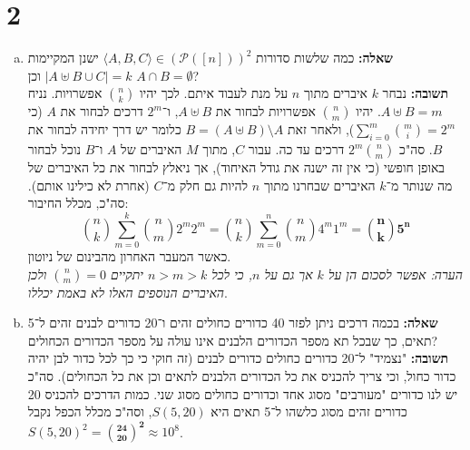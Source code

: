 \documentclass[]{article}
\newcommand\ps    {\mathcal{P}}
\newcommand\ra    {\rangle}
\newcommand\la    {\langle}
\newcommand\bink  {\binom{n}{k}}
\begin{document}
	\section*{2} %
	\begin{enumerate}[(a)]
		\item \textbf{שאלה: }כמה שלשות סדורות $\la A, B, C \ra \in (\ps([n]))^2$ ישנן המקיימות $|A \uplus B \cup C| = k$ וכן $A \cap B = \emptyset$? \\
		\textbf{תשובה: }
		נבחר $k$ איברים מתוך $n$ על מנת לעבוד איתם. לכך יהיו $\binom{n}{k}$ אפשרויות. נניח $A \uplus B = m$. יהיו $\binom{n}{m}$ אפשרויות לבחור את $A \uplus B$, ו־$2^m$ דרכים לבחור את $A$ (כי $\sum_{i = 0}^{m}\binom{m}{i} = 2^m$), ולאחר זאת $B = (A \uplus B) \setminus A$ כלומר יש דרך יחידה לבחור את $B$. סה"כ $ 2^m\binom{n}{m} $ דרכים עד כה. עבור $C$, מתוך $M$ האיברים של $A$ ו־$B$ נוכל לבחור באופן חופשי (כי אין זה ישנה את גודל האיחוד), אך ניאלץ לבחור את כל האיברים של מה שנותר מ־$k$ האיברים שבחרנו מתוך $n$ להיות גם חלק מ־$C$ (אחרת לא כילינו אותם). סה"כ, מכלל החיבור: 
		\[ \binom{n}{k}\sum_{m = 0}^{k}\binom{n}{m}2^m2^m = \bink \sum_{m = 0}^{n}\binom{n}{m}4^m1^m = \bm{\binom{n}{k}5^n} \]
		כאשר המעבר האחרון מהבינום של ניוטון. \\
		\textit{הערה: אפשר לסכום הן על $k$ אך גם על $n$, כי לכל $n > m > k$ יתקיים $\binom{n}{m} = 0$ ולכן האיברים הנוספים האלו לא באמת יכללו}. 

		\item \textbf{שאלה: }בכמה דרכים ניתן לפזר 40 כדורים כחולים זהים ו־20 כדורים לבנים זהים ל־5 תאים, כך שבכל תא מספר הכדורים הלבנים אינו עולה על מספר הכדורים הכחולים? \\
		\textbf{תשובה: }
		"נצמיד" ל־20 כדורים כחולים כדורים לבנים (זה חוקי כי כך לכל כדור לבן יהיה כדור כחול, וכי צריך להכניס את כל הכדורים הלבנים לתאים וכן את כל הכחולים). סה"כ יש לנו כדורים "מעורבים" מסוג אחד וכדורים כחולים מסוג שני. כמות הדרכים להכניס 20 כדורים זהים מסוג כלשהו ל־5 תאים היא $S(5, 20)$, וסה"כ מכלל הכפל נקבל $S(5, 20)^2 = \bm{\binom{24}{20}^2} \approx 10^{8}$. 
	\end{enumerate}
\end{document}
